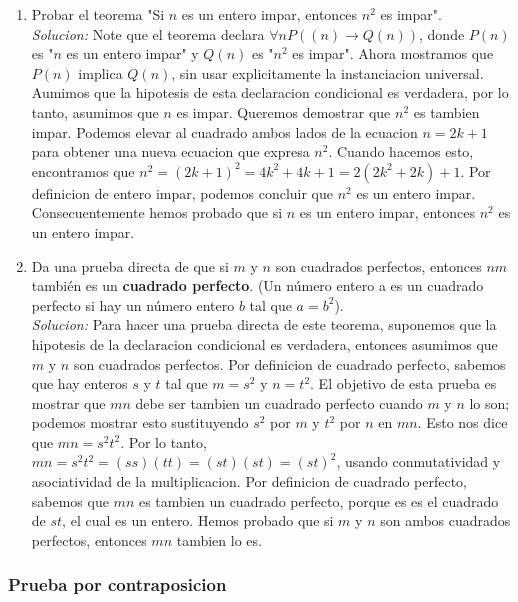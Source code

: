 \documentclass[]{article}
\begin{document}
\begin{enumerate}
	\item Probar el teorema "Si $n$ es un entero impar, entonces $n^{2}$ es impar".\\
	\textit{Solucion:} Note que el teorema declara $\forall nP((n) \rightarrow Q(n))$, donde $P(n)$ es "$n$ es un entero impar" y $Q(n)$ es "$n^{2}$ es impar". Ahora mostramos que $P(n)$ implica $Q(n)$, sin usar explicitamente la instanciacion universal. Aumimos que la hipotesis de esta declaracion condicional es verdadera, por lo tanto, asumimos que $n$ es impar. Queremos demostrar que $n^{2}$ es tambien impar. Podemos elevar al cuadrado ambos lados de la ecuacion $n = 2k + 1$ para obtener una nueva ecuacion que expresa $n^{2}$. Cuando hacemos esto, encontramos que $n^{2} = (2k + 1)^{2} = 4k^{2} + 4k + 1 = 2 (2k^{2} + 2k) + 1$. Por definicion de entero impar, podemos concluir que $n^{2}$ es un entero impar. Consecuentemente hemos probado que si $n$ es un entero impar, entonces $n^{2}$ es un entero impar.

	\item  Da una prueba directa de que si $m$ y $n$ son cuadrados perfectos, entonces $nm$ también es un \textbf{cuadrado perfecto}. (Un número entero a es un cuadrado perfecto si hay un número entero $b$ tal que $a = b^{2}$).\\
	\textit{Solucion:} Para hacer una prueba directa de este teorema, suponemos que la hipotesis de la declaracion condicional es verdadera, entonces asumimos que $m$ y $n$ son cuadrados perfectos. Por definicion de cuadrado perfecto, sabemos que hay enteros $s$ y $t$ tal que $m = s^{2}$ y $n = t^{2}$. El objetivo de esta prueba es mostrar que $mn$ debe ser tambien un cuadrado perfecto cuando $m$ y $n$ lo son; podemos mostrar esto sustituyendo $s^{2}$ por $m$ y $t^{2}$ por $n$ en $mn$. Esto nos dice que $mn = s^{2}t^{2}$. Por lo tanto, $mn = s^{2}t^{2} = (ss)(tt) = (st)(st) = (st)^{2}$, usando conmutatividad y asociatividad de la multiplicacion. Por definicion de cuadrado perfecto, sabemos que $mn$ es tambien un cuadrado perfecto, porque es es el cuadrado de $st$, el cual es un entero. Hemos probado que si $m$ y $n$ son ambos cuadrados perfectos, entonces $mn$ tambien lo es.
\end{enumerate}

\subsubsection*{Prueba por contraposicion}
\end{document}
